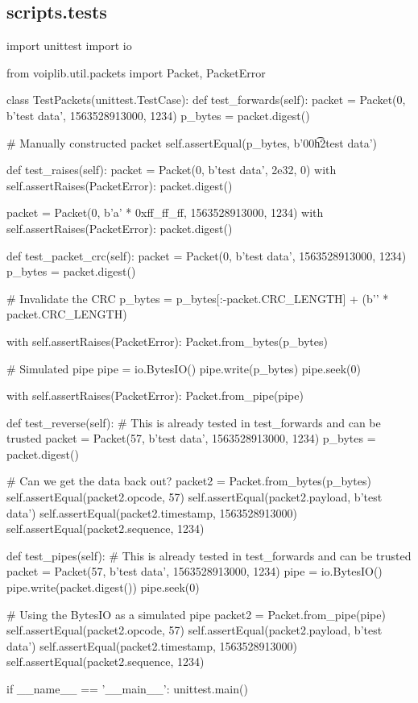 \subsection{scripts.tests}
\begin{pythoncode}
import unittest
import io

from voiplib.util.packets import Packet, PacketError


class TestPackets(unittest.TestCase):
    def test_forwards(self):
        packet = Packet(0, b'test data', 1563528913000, 1234)
        p_bytes = packet.digest()

        # Manually constructed packet
        self.assertEqual(p_bytes, b'\x00h\t{}\xd2test data')

    def test_raises(self):
        packet = Packet(0, b'test data', 2e32, 0)
        with self.assertRaises(PacketError):
            packet.digest()

        packet = Packet(0, b'a' * 0xff_ff_ff, 1563528913000, 1234)
        with self.assertRaises(PacketError):
            packet.digest()

    def test_packet_crc(self):
        packet = Packet(0, b'test data', 1563528913000, 1234)
        p_bytes = packet.digest()

        # Invalidate the CRC
        p_bytes = p_bytes[:-packet.CRC_LENGTH] + (b'\0' * packet.CRC_LENGTH)

        with self.assertRaises(PacketError):
            Packet.from_bytes(p_bytes)

        # Simulated pipe
        pipe = io.BytesIO()
        pipe.write(p_bytes)
        pipe.seek(0)

        with self.assertRaises(PacketError):
            Packet.from_pipe(pipe)

    def test_reverse(self):
        # This is already tested in test\_forwards and can be trusted
        packet = Packet(57, b'test data', 1563528913000, 1234)
        p_bytes = packet.digest()

        # Can we get the data back out?
        packet2 = Packet.from_bytes(p_bytes)
        self.assertEqual(packet2.opcode, 57)
        self.assertEqual(packet2.payload, b'test data')
        self.assertEqual(packet2.timestamp, 1563528913000)
        self.assertEqual(packet2.sequence, 1234)

    def test_pipes(self):
        # This is already tested in test\_forwards and can be trusted
        packet = Packet(57, b'test data', 1563528913000, 1234)
        pipe = io.BytesIO()
        pipe.write(packet.digest())
        pipe.seek(0)

        # Using the BytesIO as a simulated pipe
        packet2 = Packet.from_pipe(pipe)
        self.assertEqual(packet2.opcode, 57)
        self.assertEqual(packet2.payload, b'test data')
        self.assertEqual(packet2.timestamp, 1563528913000)
        self.assertEqual(packet2.sequence, 1234)


if __name__ == '__main__':
    unittest.main()
\end{pythoncode}
